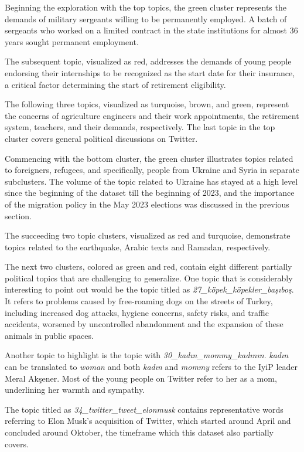 Beginning the exploration with the top topics, the green cluster represents the demands of military 
sergeants willing to be permanently employed. A batch of sergeants who worked on a limited contract
in the state institutions for almost 36 years sought permanent employment.

The subsequent topic, visualized as red, addresses the demands of young people endorsing their 
internships to be recognized as the start date for their insurance, a critical factor determining 
the start of retirement eligibility.

The following three topics, visualized as turquoise, brown, and green, represent the concerns of 
agriculture engineers and their work appointments, the retirement system, teachers, and their 
demands, respectively. The last topic in the top cluster covers general political discussions on 
Twitter.

Commencing with the bottom cluster, the green cluster illustrates topics related to foreigners, 
refugees, and specifically, people from Ukraine and Syria in separate subclusters. 
The volume of the topic related to Ukraine has stayed at a high level since the beginning of the 
dataset till the beginning of 2023, and the importance of the migration policy in the May 2023 
elections was discussed in the previous section. 

The succeeding two topic clusters, visualized as red and turquoise, demonstrate topics related to 
the earthquake, Arabic texts and Ramadan, respectively. 

The next two clusters, colored as green and red, contain eight different partially political 
topics that are challenging to generalize. One topic that is considerably interesting to point 
out would be the topic titled as \textit{27\_köpek\_köpekler\_başıboş}. It refers to problems 
caused by free-roaming dogs on the streets of Turkey, including increased dog attacks, hygiene 
concerns, safety risks, and traffic accidents, worsened by uncontrolled abandonment and the 
expansion of these animals in public spaces. 

Another topic to highlight is the topic with \textit{30\_kadın\_mommy\_kadının}. \textit{kadın} 
can be translated to \textit{woman} and both \textit{kadın} and \textit{mommy} refers to the 
\ac{IyiP} leader Meral Akşener. Most of the young people on Twitter refer to her as a mom, 
underlining her warmth and sympathy.

The topic titled as \textit{34\_twitter\_tweet\_elonmusk} contains representative words 
referring to Elon Musk's acquisition of Twitter, which started around April and concluded 
around Oktober, the timeframe which this dataset also partially covers.

